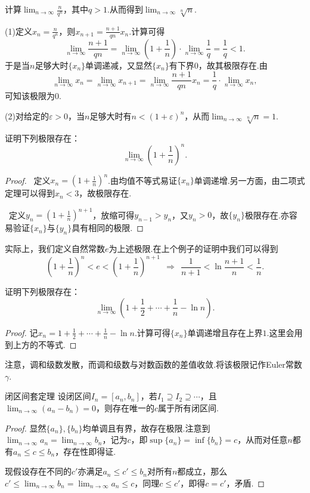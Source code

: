 \documentclass[lang=cn, zihao=5]{elegantbook}
\newcommand{\ssb}[1]{\left( #1 \right)}
\begin{document}
\begin{example}
	计算$\lim_{n\to \infty} \frac{n}{q^n}$，其中$q>1$.从而得到$\lim_{n\to \infty} \sqrt[n]{n}$.
\end{example}
\begin{solution}
	(1)定义$x_n=\frac{n}{q^n}$，则$x_{n+1}=\frac{n+1}{qn}x_n$.计算可得$$\lim_{n \to \infty} \frac{n+1}{qn} = \lim_{n \to \infty} \ssb{1+\frac{1}{n}} \cdot \lim_{n \to \infty} \frac{1}{q} = \frac{1}{q} < 1.$$
	于是当$n$足够大时$\{ x_n \}$单调递减，又显然$\{ x_n \}$有下界$0$，故其极限存在.由$$\lim_{n \to \infty} x_{n} = \lim_{n \to \infty} x_{n+1} = \lim_{n \to \infty} \frac{n+1}{qn} x_n = \frac{1}{q} \cdot \lim_{n \to \infty} x_n,$$可知该极限为$0$.
	
	(2)对给定的$\varepsilon > 0$，当$n$足够大时有$n<(1+\varepsilon)^n$，从而$\lim_{n\to \infty} \sqrt[n]{n} =1$.
\end{solution}

\begin{example}
	证明下列极限存在：$$\lim_{n\to \infty} \ssb{1+\frac{1}{n}}^n.$$
\end{example}
\begin{proof}
	~定义$x_n=(1+\frac{1}{n})^n$.由均值不等式易证$\{ x_n \}$单调递增.另一方面，由二项式定理可以得到$x_n<3$，故极限存在.
	
	~定义$y_n=(1+\frac{1}{n})^{n+1}$，放缩可得$y_{n-1}>y_n$，又$y_n>0$，故$\{ y_n \}$极限存在.亦容易验证$\{ x_n \}$与$\{ y_n \}$具有相同的极限.
\end{proof}

实际上，我们定义自然常数$e$为上述极限.在上个例子的证明中我们可以得到$$\ssb{1+\frac{1}{n}}^n < e < \ssb{1+\frac{1}{n}}^{n+1} ~~\Rightarrow ~~ \frac{1}{n+1} < \ln \frac{n+1}{n} < \frac{1}{n}.$$

\begin{example}
	证明下列极限存在：$$\lim_{n\to \infty} \ssb{ 1+\frac{1}{2}+\cdots + \frac{1}{n}-\ln n }.$$
\end{example}
\begin{proof}
	记$x_n=1+\frac{1}{2}+\cdots + \frac{1}{n}-\ln n$.计算可得$\{ x_n \}$单调递增且存在上界$1$.这里会用到上方的不等式.
\end{proof}

注意，调和级数发散，而调和级数与对数函数的差值收敛.将该极限记作Euler常数$\gamma$.

\begin{theorem}{闭区间套定理}
	设闭区间$I_n=[a_n,b_n]$，若$I_1 \supseteq I_2 \supseteq \cdots $，且$\lim_{n\to \infty} (a_n-b_n)=0$，则存在唯一的$c$属于所有闭区间.
\end{theorem}
\begin{proof}
	显然$\{ a_n \},\{ b_n \}$均单调且有界，故存在极限.注意到$\lim_{n\to \infty} a_n = \lim_{n\to \infty} b_n$，记为$c$，即$\sup \{ a_n \} = \inf \{ b_n \} = c$，从而对任意$n$都有$a_n \leq c \leq b_n$，存在性即得证.
	
	现假设存在不同的$c'$亦满足$a_n \leq c' \leq b_n$对所有$n$都成立，那么$c' \leq \lim_{n\to \infty} b_n = \lim_{n\to \infty} a_n \leq c$，同理$c \leq c'$，即得$c=c'$，矛盾.
\end{proof}
\end{document}
